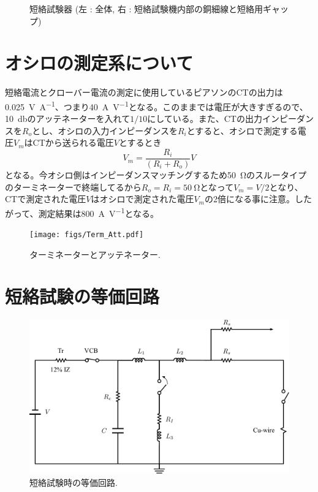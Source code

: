 \documentclass[book,openany]{jlreq}
\theoremstyle{definition}
\begin{document}
\begin{figure}[htbp]
\begin{minipage}[b]{0.45\linewidth}
  \end{minipage}
  \caption{短絡試験器 (左 : 全体, 右 : 短絡試験機内部の銅細線と短絡用ギャップ)}
  \label{fig:Tanraku}
\end{figure}

\section{オシロの測定系について}
短絡電流とクローバー電流の測定に使用しているピアソンのCTの出力は\SI{0.025}{V\per A}、つまり\SI{40}{A\per V}となる。このままでは電圧が大きすぎるので、\SI{10}{\decibel}のアッテネーターを入れて$1/10$にしている。また、CTの出力インピーダンスを$R_o$とし、オシロの入力インピーダンスを$R_i$とすると、オシロで測定する電圧$V_m$はCTから送られる電圧$V$とするとき
%
\begin{equation}
  V_m = \frac{R_i}{(R_i + R_o)} V
\end{equation}
%
となる。今オシロ側はインピーダンスマッチングするため\SI{50}{\ohm}のスルータイプのターミネーターで終端してるから$R_o=R_i=\SI{50}{\ohm}$となって$V_m=V/2$となり、CTで測定された電圧$V$はオシロで測定された電圧$V_m$の2倍になる事に注意。したがって、測定結果は\SI{800}{A\per V}となる。
%
\begin{figure}[htbp]
  \begin{center}
    \texttt{[image: figs/Term\_Att.pdf]}
    \caption{ターミネーターとアッテネーター.}
    \label{fig:Term_Att}
  \end{center}
\end{figure}

\section{短絡試験の等価回路}
\begin{figure}[htbp]
  \begin{center}
    \includegraphics[width=12cm]{figs/Equivalent_Circuit.pdf}
    \caption{短絡試験時の等価回路.}
    \label{fig:Equivalent_Circuit}
  \end{center}
\end{figure}
\end{document}
